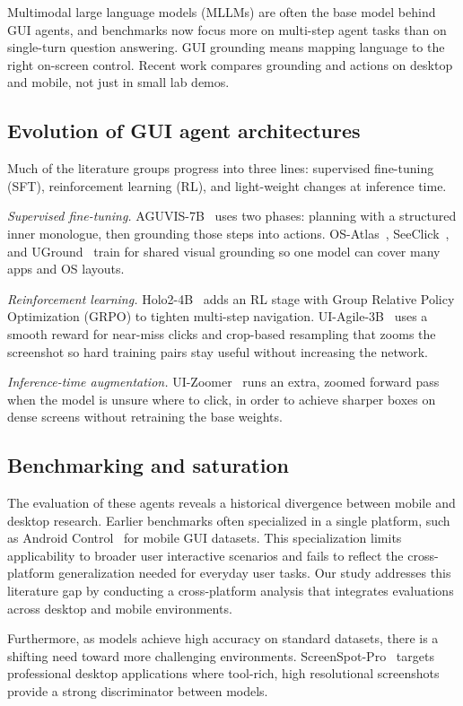 
Multimodal large language models (MLLMs) are often the base model behind GUI agents, and benchmarks now focus more on multi-step agent tasks than on single-turn question answering.
GUI grounding means mapping language to the right on-screen control.
Recent work compares grounding and actions on desktop and mobile, not just in small lab demos.

\subsection{Evolution of GUI agent architectures}

Much of the literature groups progress into three lines: supervised fine-tuning (SFT), reinforcement learning (RL), and light-weight changes at inference time.

\noindent\textit{Supervised fine-tuning.}
AGUVIS-7B~\cite{aguvis} uses two phases: planning with a structured inner monologue, then grounding those steps into actions.
OS-Atlas~\cite{wutetal2024osatlas}, SeeClick~\cite{chengetal2024seeclick}, and UGround~\cite{gou2024uground} train for shared visual grounding so one model can cover many apps and OS layouts.

\noindent\textit{Reinforcement learning.}
Holo2-4B~\cite{holo2} adds an RL stage with Group Relative Policy Optimization (GRPO) to tighten multi-step navigation.
UI-Agile-3B~\cite{uiagile} uses a smooth reward for near-miss clicks and crop-based resampling that zooms the screenshot so hard training pairs stay useful without increasing the network.

\noindent\textit{Inference-time augmentation.}
UI-Zoomer~\cite{uizoomer} runs an extra, zoomed forward pass when the model is unsure where to click, in order to achieve sharper boxes on dense screens without retraining the base weights.

\subsection{Benchmarking and saturation}

The evaluation of these agents reveals a historical divergence between mobile and desktop research. Earlier benchmarks often specialized in a single platform, such as Android Control~\cite{androidcontrol} for mobile GUI datasets. This specialization limits applicability to broader user interactive scenarios and fails to reflect the cross-platform generalization needed for everyday user tasks. Our study addresses this literature gap by conducting a cross-platform analysis that integrates evaluations across desktop and mobile environments.

Furthermore, as models achieve high accuracy on standard datasets, there is a shifting need toward more challenging environments. ScreenSpot-Pro~\cite{li2025screenspotpro} targets professional desktop applications where tool-rich, high resolutional screenshots provide a strong discriminator between models.

